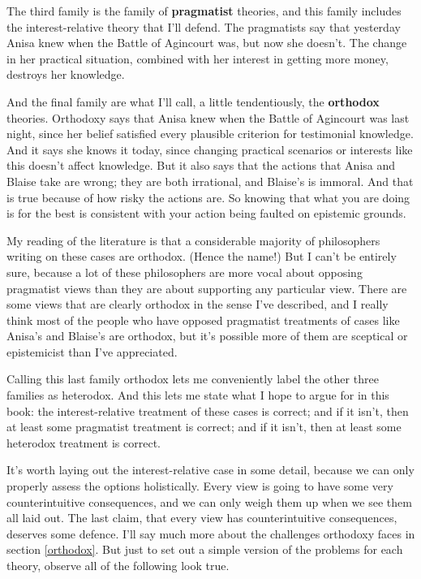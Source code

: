\documentclass[
  11pt,
]{book}
\begin{document}
The third family is the family of \textbf{pragmatist} theories, and this family includes the interest-relative theory that I'll defend. The pragmatists say that yesterday Anisa knew when the Battle of Agincourt was, but now she doesn't. The change in her practical situation, combined with her interest in getting more money, destroys her knowledge.

And the final family are what I'll call, a little tendentiously, the \textbf{orthodox} theories. Orthodoxy says that Anisa knew when the Battle of Agincourt was last night, since her belief satisfied every plausible criterion for testimonial knowledge. And it says she knows it today, since changing practical scenarios or interests like this doesn't affect knowledge. But it also says that the actions that Anisa and Blaise take are wrong; they are both irrational, and Blaise's is immoral. And that is true because of how risky the actions are. So knowing that what you are doing is for the best is consistent with your action being faulted on epistemic grounds.

My reading of the literature is that a considerable majority of philosophers writing on these cases are orthodox. (Hence the name!) But I can't be entirely sure, because a lot of these philosophers are more vocal about opposing pragmatist views than they are about supporting any particular view. There are some views that are clearly orthodox in the sense I've described, and I really think most of the people who have opposed pragmatist treatments of cases like Anisa's and Blaise's are orthodox, but it's possible more of them are sceptical or epistemicist than I've appreciated.

Calling this last family orthodox lets me conveniently label the other three families as heterodox. And this lets me state what I hope to argue for in this book: the interest-relative treatment of these cases is correct; and if it isn't, then at least some pragmatist treatment is correct; and if it isn't, then at least some heterodox treatment is correct.

It's worth laying out the interest-relative case in some detail, because we can only properly assess the options holistically. Every view is going to have some very counterintuitive consequences, and we can only weigh them up when we see them all laid out. The last claim, that every view has counterintuitive consequences, deserves some defence. I'll say much more about the challenges orthodoxy faces in section \ref{orthodox}. But just to set out a simple version of the problems for each theory, observe all of the following look true.
\end{document}
